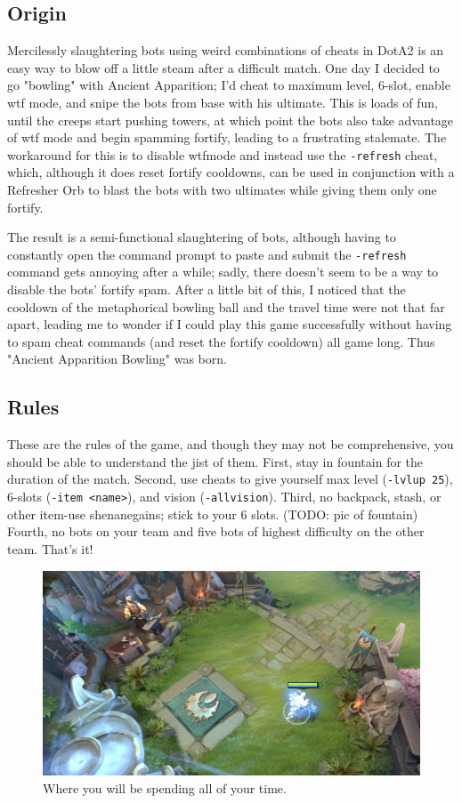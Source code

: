 \documentclass{article}
\begin{document}
\subsection*{Origin}
Mercilessly slaughtering bots using weird combinations of cheats in DotA2 is an easy way to blow off a little steam after a difficult match.  One day I decided to go "bowling" with Ancient Apparition; I'd cheat to maximum level, 6-slot, enable wtf mode, and snipe the bots from base with his ultimate.
This is loads of fun, until the creeps start pushing towers, at which point the bots also take advantage of wtf mode and begin spamming fortify, leading to a frustrating stalemate.  The workaround for this is to disable wtfmode and instead use the \texttt{-refresh} cheat, which, although it does reset fortify cooldowns, can be used in conjunction with a Refresher Orb to blast the bots with two ultimates while giving them only one fortify.

The result is a semi-functional slaughtering of bots, although having to constantly open the command prompt to paste and submit the \texttt{-refresh} command gets annoying after a while; sadly, there doesn't seem to be a way to disable the bots' fortify spam.  After a little bit of this, I noticed that the cooldown of the metaphorical bowling ball and the travel time were not that far apart, leading me to wonder if I could play this game successfully without having to spam cheat commands (and reset the fortify cooldown) all game long.  Thus "Ancient Apparition Bowling" was born.

\subsection*{Rules}
These are the rules of the game, and though they may not be comprehensive, you should be able to understand the jist of them.  First, stay in fountain for the duration of the match.  Second, use cheats to give yourself max level (\texttt{-lvlup 25}), 6-slots (\texttt{-item <name>}), and vision (\texttt{-allvision}).  Third, no backpack, stash, or other item-use shenanegains; stick to your 6 slots. (TODO: pic of fountain)  Fourth, no bots on your team and five bots of highest difficulty on the other team.  That's it!
\begin{figure}
\includegraphics[scale=0.33]{files/blog/2017_07_17_ancient_apparition_bowling/fountain.png}
\caption{Where you will be spending all of your time.}
\end{figure}
\end{document}
